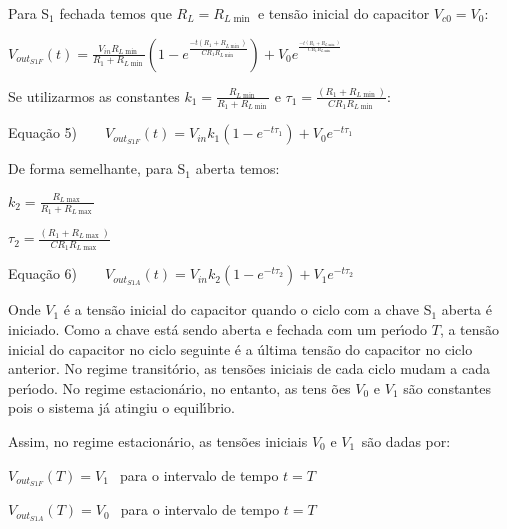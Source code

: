 \documentclass{article}
\begin{document}
\vspace{1pt}

Para S$_{\text{1}}$ fechada temos que $R_{L}=R_{L\min }$ e tens\~{a}o
inicial do capacitor $V_{c0}=V_{0}:$

$V_{out_{S1F}}\left( t\right) =\frac{V_{in}R_{L\min }}{R_{1}+R_{L\min }}%
\left( 1-e^{\frac{-t\left( R_{1}+R_{L\min }\right) }{CR_{1}R_{L\min }}%
}\right) +V_{0}e^{^{\frac{-t\left( R_{1}+R_{L\min }\right) }{CR_{1}R_{L\min }%
}}}$

Se utilizarmos as constantes $k_{1}=\frac{R_{L\min }}{R_{1}+R_{L\min }}$ e $%
\tau _{1}=\frac{\left( R_{1}+R_{L\min }\right) }{CR_{1}R_{L\min }}:$

Equa\c{c}\~{a}o 5)$\qquad V_{out_{S1F}}\left( t\right) =V_{in}k_{1}\left(
1-e^{-t\tau _{1}}\right) +V_{0}e^{-t\tau _{1}}$

\vspace{1pt}

De forma semelhante, para S$_{\text{1}}$ aberta temos:

$k_{2}=\frac{R_{L\max }}{R_{1}+R_{L\max }}$ 

$\tau _{2}=\frac{\left( R_{1}+R_{L\max }\right) }{CR_{1}R_{L\max }}$

\vspace{1pt}

\vspace{1pt}Equa\c{c}\~{a}o 6)$\qquad V_{out_{S1A}}\left( t\right)
=V_{in}k_{2}\left( 1-e^{-t\tau _{2}}\right) +V_{1}e^{-t\tau _{2}}$

\vspace{1pt}

Onde $V_{1}$ \'{e} a tens\~{a}o inicial do capacitor quando o ciclo com a
chave S$_{\text{1}}$ aberta \'{e} iniciado. Como a chave est\'{a} sendo
aberta e fechada com um per\'{\i}odo $T$, a tens\~{a}o inicial do capacitor
no ciclo seguinte \'{e} a \'{u}ltima tens\~{a}o do capacitor no ciclo
anterior. No regime transit\'{o}rio, as tens\~{o}es iniciais de cada ciclo
mudam a cada per\'{\i}odo. No regime estacion\'{a}rio, no entanto, as tens%
\~{o}es $V_{0}$ e $V_{1}$ s\~{a}o constantes pois o sistema j\'{a} atingiu o
equil\'{\i}brio.

Assim, no regime estacion\'{a}rio, as tens\~{o}es iniciais $V_{0}$ e $V_{1%
\text{ }}$s\~{a}o dadas por:

\vspace{1pt}$V_{out_{S1F}}\left( T\right) =V_{1\text{ }}$ para o intervalo
de tempo $t=T$

$V_{out_{S1A}}\left( T\right) =V_{0\text{ }}$ para o intervalo de tempo $t=T$
\end{document}

